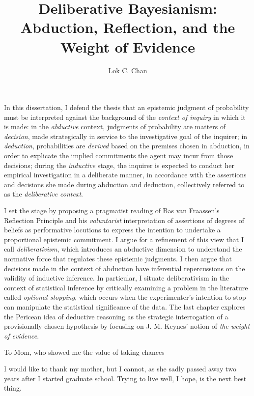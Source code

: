 \documentclass[PhD]{dukethesis2006}
\author{Lok C. Chan}
\title{Deliberative Bayesianism:\\Abduction, Reflection, and the Weight of Evidence}
\newenvironment{dedication}
  {\clearpage           %
   \thispagestyle{empty}%
   \vspace*{\stretch{1}}%
   \itshape             %
   \raggedleft          %
  }
  {\par %
   \vspace{\stretch{3}} %
   \clearpage           %
  }
\begin{document}
\maketitle

\makeabstract
\Copyright
\abstract
In this dissertation, I defend the thesis that an epistemic judgment of
probability must be interpreted against the background of the
\emph{context of inquiry} in which it is made: in the \emph{abductive} context,
judgments of probability are matters of \emph{decision}, made
strategically in service to the investigative goal of the inquirer; in
\emph{deduction}, probabilities are \emph{derived} based on the
premises chosen in abduction, in order to explicate the implied
commitments the agent may incur from those decisions; during the
\emph{inductive} stage, the inquirer is expected to conduct her empirical
investigation in a deliberate manner, in accordance with the assertions and
decisions she made during abduction and deduction, collectively referred
to as the \emph{deliberative context}.

I set the stage by proposing a pragmatist reading of Bas van Fraassen's Reflection Principle and his \emph{voluntarist} interpretation of assertions of degrees of beliefs as performative locutions to express the intention to undertake a proportional epistemic commitment. I argue for a refinement of this view that I call \emph{deliberativism}, which introduces an abductive dimension to understand the normative force that regulates these epistemic judgments. I then argue that decisions made in the context of abduction have inferential repercussions on the validity of inductive inference. In particular, I situate deliberativism in the context of statistical inference by critically examining a problem in the literature called \emph{optional stopping}, which occurs when the experimenter's intention to stop can manipulate the statistical significance of the data. The last chapter explores the Pericean idea of deductive reasoning as the strategic interrogation of a provisionally chosen hypothesis by focusing on J. M. Keynes' notion of \emph{the weight of evidence}.


\begin{dedication}
	To Mom, who showed me the value of taking chances
	\end{dedication}

\singlespacing
\tableofcontents
\listoffigures
\listoftables
\doublespacing

\acknowledgements

I would like to thank my mother, but I cannot, as she sadly passed away two years after I started graduate school. Trying to live well, I hope, is the next best thing.
\end{document}
